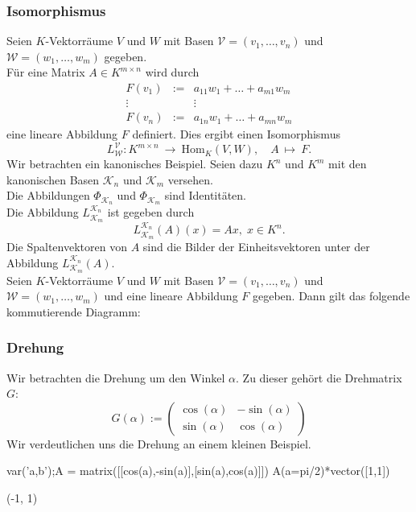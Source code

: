 \documentclass[fontsize=12pt,paper=a4,twoside,bibtotoc,idxtotoc,
liststotoc,pagesize,BCOR1.2cm,DIV15,chapterprefix,pagesize=pdftex]{scrbook}
\theoremstyle{plain}
\theoremstyle{definition}
\theoremstyle{remark}
\begin{document}
\subsubsection{Isomorphismus}
Seien $K$-Vektorräume $V$ und $W$ mit Basen $\mathcal{V}=(v_1, \dots
,v_n)$ und $\mathcal{W}=(w_1, \dots ,w_m)$ gegeben.\\
Für eine Matrix $A\in K^{m \times n}$ wird durch
\begin{eqnarray*}
F(v_1) & := & a_{11}w_1 + \dots +a_{m1} w_m\\
\vdots &    & \vdots     \\
F(v_n) & := & a_{1n} w_1 + \dots + a_{mn}w_m
\end{eqnarray*}
eine lineare Abbildung $F$ definiert. Dies ergibt einen Isomorphismus
\[
L^\mathcal{V}_\mathcal{W}: K^{m \times n} \ \rightarrow \
\mathrm{Hom}_K(V,W), \quad A \ \mapsto \ F.
\] 
Wir betrachten ein kanonisches Beispiel. Seien dazu $K^n$ und $K^m$ mit den kanonischen Basen $\mathcal{K}_n$ und
$\mathcal{K}_m$ versehen.\\
Die Abbildungen $\Phi_{\mathcal{K}_n}$ und $\Phi_{\mathcal{K}_m}$
sind Identitäten.\\
Die Abbildung $L^{\mathcal{K}_n}_{\mathcal{K}_m}$ ist gegeben
durch 
\[ L^{\mathcal{K}_n}_{\mathcal{K}_m} (A)(x)=Ax,\; x \in K^n. \]
Die Spaltenvektoren von $A$ sind die Bilder der Einheitsvektoren
unter der Abbildung  $L^{\mathcal{K}_n}_{\mathcal{K}_m}(A)$.\\
Seien $K$-Vektorräume $V$ und $W$ mit Basen $\mathcal{V}=(v_1, \dots
,v_n)$ und $\mathcal{W}=(w_1, \dots ,w_m)$ und eine lineare Abbildung
$F$ gegeben. Dann gilt das folgende kommutierende Diagramm:
\begin{center}
\end{center}
\subsubsection{Drehung}
Wir betrachten die Drehung um den Winkel $\alpha$. Zu dieser gehört die Drehmatrix $G$:
\[ G(\alpha):= \left ( \begin{array}{cc}
\cos(\alpha) & -\sin(\alpha) \\
\sin(\alpha) & \cos(\alpha)
\end{array} \right)
\]
Wir verdeutlichen uns die Drehung an einem kleinen Beispiel.
\begin{sagein}
var('a,b');A = matrix([[cos(a),-sin(a)],[sin(a),cos(a)]])
A(a=pi/2)*vector([1,1])
\end{sagein}
\begin{sage}
 (-1, 1)
\end{sage}
\end{document}
